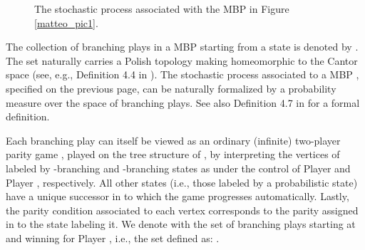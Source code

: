 \begin{figure}[H]
\caption{The stochastic process associated with the MBP in Figure \ref{matteo_pic1}.}
\label{matteo_pic3}
\end{figure}
 



\begin{comment}
When  (i.e. when  is a Markov chain) the produced  has only one infinite branch and can, therefore, be identified as a chain. Hence the stochastic process associated with MBP's generalizes that of Markov chains. 
\end{comment}


The collection of branching plays in a MBP  starting from a state  is denoted by . The set  naturally carries a Polish topology making  homeomorphic to the Cantor space (see, e.g., Definition 4.4 in \cite{MIO2012b}). The stochastic process associated to a MBP , specified on the previous page, can be naturally formalized by a probability measure  over the space  of branching plays. See also Definition 4.7 in \cite{MIO2012b} for a formal definition.



Each branching play  can itself be viewed as an ordinary (infinite) two-player parity game , played on the tree structure of ,  by interpreting the vertices of  labeled by -branching and -branching states as under the control of Player  and Player , respectively. All other states (i.e., those labeled by a probabilistic state) have a unique successor in  to which the game  progresses automatically. Lastly, the parity condition associated to each vertex corresponds to the parity assigned in  to the state labeling it.  We denote with  the set of branching plays starting at  and winning for Player , i.e., the set defined as: \exists.

